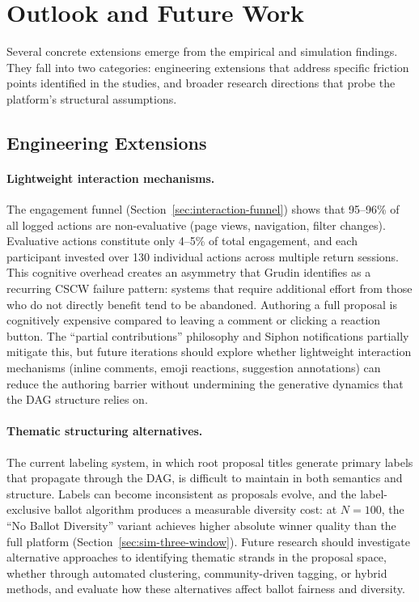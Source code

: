 \documentclass[a4paper, 12pt, twoside]{iviathesis}
\begin{document}
\section{Outlook and Future Work}
\label{sec:future-work}

Several concrete extensions emerge from the empirical and simulation findings. They fall into two categories: engineering extensions that address specific friction points identified in the studies, and broader research directions that probe the platform's structural assumptions.

\subsection{Engineering Extensions}

\paragraph{Lightweight interaction mechanisms.}
The engagement funnel (Section~\ref{sec:interaction-funnel}) shows that 95--96\% of all logged actions are non-evaluative (page views, navigation, filter changes). Evaluative actions constitute only 4--5\% of total engagement, and each participant invested over 130 individual actions across multiple return sessions. This cognitive overhead creates an asymmetry that Grudin \cite{grudin1988cscw} identifies as a recurring CSCW failure pattern: systems that require additional effort from those who do not directly benefit tend to be abandoned. Authoring a full proposal is cognitively expensive compared to leaving a comment or clicking a reaction button. The ``partial contributions'' philosophy and Siphon notifications partially mitigate this, but future iterations should explore whether lightweight interaction mechanisms (inline comments, emoji reactions, suggestion annotations) can reduce the authoring barrier without undermining the generative dynamics that the DAG structure relies on.

\paragraph{Thematic structuring alternatives.}
The current labeling system, in which root proposal titles generate primary labels that propagate through the DAG, is difficult to maintain in both semantics and structure. Labels can become inconsistent as proposals evolve, and the label-exclusive ballot algorithm produces a measurable diversity cost: at $N=100$, the ``No Ballot Diversity'' variant achieves higher absolute winner quality than the full platform (Section~\ref{sec:sim-three-window}). Future research should investigate alternative approaches to identifying thematic strands in the proposal space, whether through automated clustering, community-driven tagging, or hybrid methods, and evaluate how these alternatives affect ballot fairness and diversity.
\end{document}
